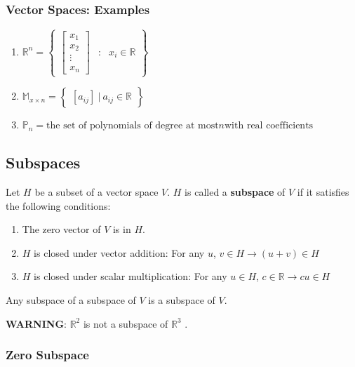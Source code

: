 \documentclass[12pt, letterpaper]{article}
\begin{document}
\subsubsection*{Vector Spaces: Examples}

\begin{enumerate}
  \item $ \mathbb{R}^n =
    \begin{Bmatrix}
      \begin{bmatrix}
        x_1 \\
        x_2 \\
        \vdots \\
        x_n
      \end{bmatrix} & : & x_i \in \mathbb{R}
    \end{Bmatrix} $
  \item $ \mathbb{M}_{x \times n} =
    \begin{Bmatrix}
      [a_{ij}] \: | \:  a_{ij} \in \mathbb{R}
    \end{Bmatrix} $
  \item $ \mathbb{P}_n = \textrm{the set of polynomials of degree at
    most} n \textrm{with real coefficients} $
\end{enumerate}

\subsection*{Subspaces}

Let $ H $ be a subset of a vector space $ V $. $ H $ is called a
\textbf{subspace} of $ V $ if it satisfies the following conditions:

\begin{enumerate}
  \item The zero vector of $ V $ is in $ H $.
  \item $ H $ is closed under vector addition:
    For any $ u $, $ v \in H \rightarrow (u + v) \in H $
  \item $ H $ is closed under scalar multiplication:
    For any $ u \in H $, $ c \in \mathbb{R} \rightarrow cu \in H $
\end{enumerate}

Any subspace of a subspace of $ V $ is a subspace of $ V $.
\bigskip

\textbf{WARNING}: $ \mathbb{R}^2 $ is not a subspace of $ \mathbb{R}^3 $ .

\subsubsection*{Zero Subspace}
\end{document}
